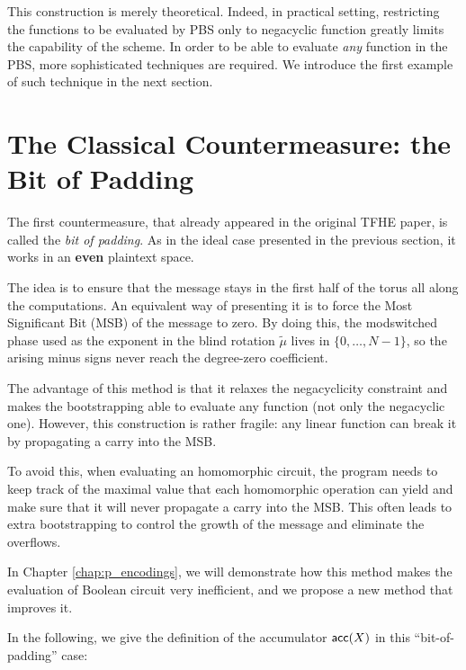 This construction is merely theoretical. Indeed, in practical setting, restricting the functions to be evaluated by PBS only to negacyclic function greatly limits the capability of the scheme. In order to be able to evaluate \textit{any} function in the PBS, more sophisticated techniques are required. We introduce the first example of such technique in the next section.


\section{The Classical Countermeasure: the Bit of Padding}
\label{sec:bit_of_padding}

The first countermeasure, that already appeared in the original TFHE paper, is called the \textit{bit of padding}. As in the ideal case presented in the previous section, it works in an \textbf{even} plaintext space.

The idea is to ensure that the message stays in the first half of the torus all along the computations. An equivalent way of presenting it is to force the Most Significant Bit (MSB) of the message to zero. By doing this, the modswitched phase used as the exponent in the blind rotation $\tilde{\mu}$ lives in $\{0, \dots, N - 1\}$, so the arising minus signs never reach the degree-zero coefficient.

The advantage of this method is that it relaxes the negacyclicity constraint and makes the bootstrapping able to evaluate any function (not only the negacyclic one). However, this construction is rather fragile: any linear function can break it by propagating a carry into the MSB. 

To avoid this, when evaluating an homomorphic circuit, the program needs to keep track of the maximal value that each homomorphic operation can yield and make sure that it will never propagate a carry into the MSB. This often leads to extra bootstrapping to control the growth of the message and eliminate the overflows. 

In Chapter \ref{chap:p_encodings}, we will demonstrate how this method makes the evaluation of Boolean circuit very inefficient, and we propose a new method that improves it.

In the following, we give the definition of the accumulator $\textsf{acc}(X)$ in this ``bit-of-padding'' case:

